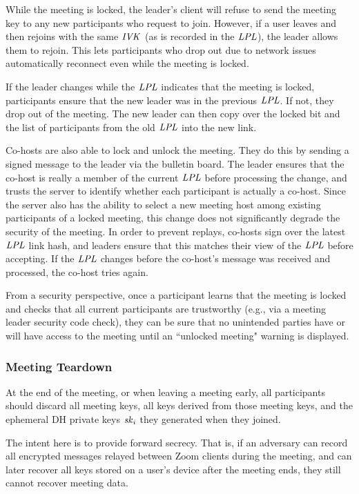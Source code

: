 While the meeting is locked, the leader's client will refuse to send the meeting key to any new
participants who request to join. However, if a user leaves and then rejoins with the same $\mathit{IVK}$
(as is recorded in the $\mathit{LPL}$), the leader allows them to rejoin. This lets participants who drop
out due to network issues automatically reconnect even while the meeting is locked. 

If the leader changes while the $\mathit{LPL}$ indicates that the meeting is locked, participants ensure
that the new leader was in the previous $\mathit{LPL}$. If not, they drop out of the meeting. The new leader
can then copy over the locked bit and the list of participants from the old $\mathit{LPL}$ into the new
link.

Co-hosts are also able to lock and unlock the meeting. They do this by sending a signed message to
the leader via the bulletin board. The leader ensures that the co-host is really a member of the
current $\mathit{LPL}$ before processing the change, and trusts the server to identify whether each
participant is actually a co-host. Since the server also has the ability to select a new meeting
host among existing participants of a locked meeting, this change does not significantly degrade the
security of the meeting. In order to prevent replays, co-hosts sign over the latest $\mathit{LPL}$ link
hash, and leaders ensure that this matches their view of the $\mathit{LPL}$ before accepting. If the $\mathit{LPL}$
changes before the co-host's message was received and processed, the co-host tries again.

From a security perspective, once a participant learns that the meeting is locked and checks that
all current participants are trustworthy (e.g., via a meeting leader security code check), they can
be sure that no unintended parties have or will have access to the meeting until an ``unlocked
meeting" warning is displayed. 

\subsubsection{Meeting Teardown}
At the end of the meeting, or when leaving a meeting early, all participants should discard all
meeting keys, all keys derived from those meeting keys, and the ephemeral DH private keys $\mathit{sk}_i$
they generated when they joined.

The intent here is to provide forward secrecy. That is, if an adversary can record all encrypted
messages relayed between Zoom clients during the meeting, and can later recover all keys stored on a
user's device after the meeting ends, they still cannot recover meeting data.

